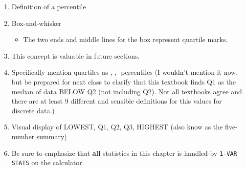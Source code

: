 \documentclass{article}
\begin{document}
\begin{enumerate}

    \item Definition of a percentile

    \item Box-and-whisker
    
        \begin{itemize}
        
        \item The two ends and middle lines for the box represent quartile marks.
        
        \end{itemize}

    \item This concept is valuable in future sections.

    \item Specifically mention quartiles as , , -percentiles (I wouldn’t mention it now, but be prepared for next class to clarify that this textbook finds Q1 as the median of data BELOW Q2 (not including Q2). Not all textbooks agree and there are at least 9 different and sensible definitions for this values for discrete data.)

    \item Visual display of LOWEST, Q1, Q2, Q3, HIGHEST (also know as the five-number summary)
    
    \item Be sure to emphasize that {\bf all} statistics in this chapter is handled by \texttt{1-VAR STATS} on the calculator.
    
\end{enumerate}
\end{document}
